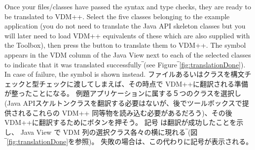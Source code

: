 \documentclass[\pformat,12pt]{jarticle}
\newcommand{\guicmd}[1]{{\sf #1}}
\begin{document}
Once your files/classes have passed the syntax and type checks, they
are ready to be translated to VDM++. Select the five classes belonging
to the example application (you do not need to translate the Java API
skeleton classes but you will later need to load VDM++ equivalents of
these which are also supplied with the Toolbox), then press the
button to translate them to VDM++. The symbol 
appears in the \guicmd{VDM} column of the \guicmd{Java View} next to
each of the selected classes to indicate that it was translated
successfully‾(see Figure‾\ref{fig:translationDone}). In case of failure,
the symbol  
is shown instead.
ファイルあるいはクラスを構文チェックと型チェックに渡してしまえば、その時点で VDM++に翻訳される準備が整ったことになる。 
例題アプリケーションに属する５つのクラスを選択し(Java APIスケルトンクラスを翻訳する必要はないが、後でツールボックスで提供されるこれらの VDM++ 同等物を読み込む必要があるだろう)、その後 VDM++に翻訳するためにボタンを押そう。 
記号 は翻訳が成功したことを示し、 \guicmd{Java View} で \guicmd{VDM} 列の選択クラス各々の横に現れる‾(図‾\ref{fig:translationDone}を参照)。 
失敗の場合は、この代わりに記号が表示される。
\end{document}
